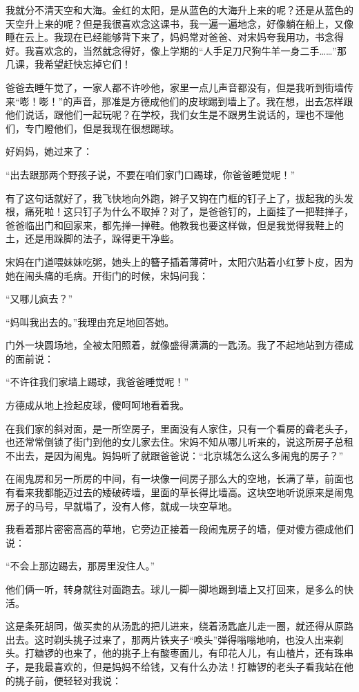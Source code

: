 \par 我就分不清天空和大海。金红的太阳，是从蓝色的大海升上来的呢？还是从蓝色的天空升上来的呢？但是我很喜欢念这课书，我一遍一遍地念，好像躺在船上，又像睡在云上。我现在已经能够背下来了，妈妈常对爸爸、对宋妈夸我用功，书念得好。我喜欢念的，当然就念得好，像上学期的“人手足刀尺狗牛羊一身二手……”那几课，我希望赶快忘掉它们！
\par 爸爸去睡午觉了，一家人都不许吵他，家里一点儿声音都没有，但是我听到街墙传来“嘭！嘭！”的声音，那准是方德成他们的皮球踢到墙上了。我在想，出去怎样跟他们说话，跟他们一起玩呢？在学校，我们女生是不跟男生说话的，理也不理他们，专门瞪他们，但是我现在很想踢球。
\par 好妈妈，她过来了：
\par “出去跟那两个野孩子说，不要在咱们家门口踢球，你爸爸睡觉呢！”
\par 有了这句话就好了，我飞快地向外跑，辫子又钩在门框的钉子上了，拔起我的头发根，痛死啦！这只钉子为什么不取掉？对了，是爸爸钉的，上面挂了一把鞋掸子，爸爸临出门和回家来，都先掸一掸鞋。他教我也要这样做，但是我觉得我鞋上的土，还是用跺脚的法子，跺得更干净些。
\par 宋妈在门道喂妹妹吃粥，她头上的簪子插着薄荷叶，太阳穴贴着小红萝卜皮，因为她在闹头痛的毛病。开街门的时候，宋妈问我：
\par “又哪儿疯去？”
\par “妈叫我出去的。”我理由充足地回答她。
\par 门外一块圆场地，全被太阳照着，就像盛得满满的一匙汤。我了不起地站到方德成的面前说：
\par “不许往我们家墙上踢球，我爸爸睡觉呢！”
\par 方德成从地上捡起皮球，傻呵呵地看着我。
\par 在我们家的斜对面，是一所空房子，里面没有人家住，只有一个看房的聋老头子，也还常常倒锁了街门到他的女儿家去住。宋妈不知从哪儿听来的，说这所房子总租不出去，是因为闹鬼。妈妈听了就跟爸爸说：“北京城怎么这么多闹鬼的房子？”
\par 在闹鬼房和另一所房的中间，有一块像一间房子那么大的空地，长满了草，前面也有看来我都能迈过去的矮破砖墙，里面的草长得比墙高。这块空地听说原来是闹鬼房子的马号，早就塌了，没有人修，就成一块空草地。
\par 我看着那片密密高高的草地，它旁边正接着一段闹鬼房子的墙，便对傻方德成他们说：
\par “不会上那边踢去，那房里没住人。”
\par 他们俩一听，转身就往对面跑去。球儿一脚一脚地踢到墙上又打回来，是多么的快活。
\par 这是条死胡同，做买卖的从汤匙的把儿进来，绕着汤匙底儿走一圈，就还得从原路出去。这时剃头挑子过来了，那两片铁夹子“唤头”弹得嗡嗡地响，也没人出来剃头。打糖锣的也来了，他的挑子上有酸枣面儿，有印花人儿，有山楂片，还有珠串子，是我最喜欢的，但是妈妈不给钱，又有什么办法！打糖锣的老头子看我站在他的挑子前，便轻轻对我说：
